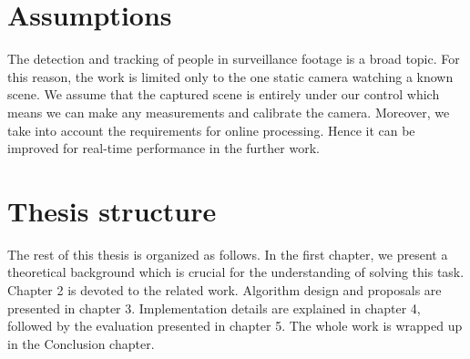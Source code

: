 \begin{introduction}
    \section{Assumptions}   
        The detection and tracking of people in surveillance footage is a broad topic. For this reason, the work is limited only to the one static camera watching a known scene. We assume that the captured scene is entirely under our control which means we can make any measurements and calibrate the camera. Moreover, we take into account the requirements for online processing. Hence it can be improved for real-time performance in the further work. 
    
    \section{Thesis structure}
        The rest of this thesis is organized as follows. In the first chapter, we present a theoretical background which is crucial for the understanding of solving this task. Chapter 2 is devoted to the related work. Algorithm design and proposals are presented in chapter 3. Implementation details are explained in chapter 4, followed by the evaluation presented in chapter 5. The whole work is wrapped up in the Conclusion chapter.
    
\end{introduction}